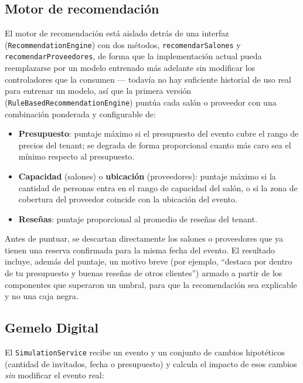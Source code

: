 \subsection{Motor de recomendación}\label{sec:motor-recomendacion}

El motor de recomendación está aislado detrás de una interfaz
(\texttt{RecommendationEngine}) con dos métodos, \texttt{recomendarSalones}
y \texttt{recomendarProveedores}, de forma que la implementación actual
pueda reemplazarse por un modelo entrenado más adelante sin modificar los
controladores que la consumen --- todavía no hay suficiente historial de
uso real para entrenar un modelo, así que la primera versión
(\texttt{RuleBasedRecommendationEngine}) puntúa cada salón o proveedor
con una combinación ponderada y configurable de:

\begin{itemize}
    \item \textbf{Presupuesto}: puntaje máximo si el presupuesto del
          evento cubre el rango de precios del tenant; se degrada de
          forma proporcional cuanto más caro sea el mínimo respecto al
          presupuesto.
    \item \textbf{Capacidad} (salones) o \textbf{ubicación}
          (proveedores): puntaje máximo si la cantidad de personas entra
          en el rango de capacidad del salón, o si la zona de cobertura
          del proveedor coincide con la ubicación del evento.
    \item \textbf{Reseñas}: puntaje proporcional al promedio de reseñas
          del tenant.
\end{itemize}

Antes de puntuar, se descartan directamente los salones o proveedores que
ya tienen una reserva confirmada para la misma fecha del evento. El
resultado incluye, además del puntaje, un motivo breve (por ejemplo,
``destaca por dentro de tu presupuesto y buenas reseñas de otros
clientes'') armado a partir de los componentes que superaron un umbral,
para que la recomendación sea explicable y no una caja negra.

\subsection{Gemelo Digital}\label{sec:gemelo-digital}

El \texttt{SimulationService} recibe un evento y un conjunto de cambios
hipotéticos (cantidad de invitados, fecha o presupuesto) y calcula el
impacto de esos cambios \emph{sin} modificar el evento real:

